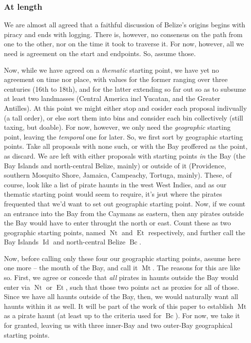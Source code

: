 \documentclass{amsart}
\DeclareMathOperator{\id}{Id}%
\DeclareMathOperator{\mt}{Mt}%
\DeclareMathOperator{\bc}{Bc}%
\DeclareMathOperator{\et}{Et}%
\DeclareMathOperator{\nt}{Nt}%
\theoremstyle{definition}%
\theoremstyle{definition}%
\theoremstyle{remark}%
\theoremstyle{definition}%
\theoremstyle{definition}%
\begin{document}
\subsubsection{At length} We are almost all agreed that a faithful discussion of Belize's origins begins with piracy and ends with logging. There is, however, no consensus on the path from one to the other, nor on the time it took to traverse it. For now, however, all we need is agreement on the start and endpoints. So, assume those.

Now, while we have agreed on a \emph{thematic} starting point, we have yet no agreement on time nor place, with values for the former ranging over three centuries (16th to 18th), and for the latter extending so far out so as to subsume at least two landmasses (Central America incl Yucatan, and the Greater Antilles). At this point we might either stop and cosider each proposal indivually (a tall order), or else sort them into bins and consider each bin collectively (still taxing, but doable). For now, however, we only need the \emph{geographic} starting point, leaving the \emph{temporal} one for later. So, we first sort by geographic starting points. Take all proposals with none such, or with the Bay proffered as the point, as discard. We are left with either proposals with starting points \emph{in} the Bay (the Bay Islands and north-central Belize, mainly) or outside of it (Providence, southern Mosquito Shore, Jamaica, Campeachy, Tortuga, mainly). These, of course, look like a list of pirate haunts in the west West Indies, and as our thematic starting point would seem to require, it's jsut where the pirates frequented that we'd want to set out geographic starting point. Now, if we count an entrance into the Bay from the Caymans as eastern, then any pirates outside the Bay would have to enter throught the north or east. Count these as two geographic starting points, named \(\nt\) and \(\et\) respectively, and further call the Bay Islands \(\id\) and north-central Belize \(\bc\).

Now, before calling only these four our geographic starting points, assume here one more -- the mouth of the Bay, and call it \(\mt\). The reasons for this are like so. First, we agree or concede that \emph{all} pirates in haunts outside the Bay would enter via \(\nt\) or \(\et\), such that those two points act as proxies for all of those. Since we have all haunts outside of the Bay, then, we would naturally want all haunts within it as well. It will be part of the work of this paper to establish \(\mt\) as a pirate haunt (at least up to the criteria used for \(\bc\)). For now, we take it for granted, leaving us with three inner-Bay and two outer-Bay geographical starting points.
\end{document}
